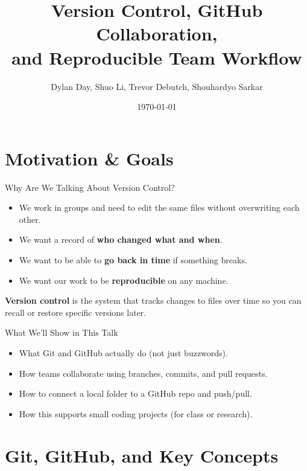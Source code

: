 \documentclass{beamer}
\title[Collaboration with GitHub \hspace{3mm} Version Control in Practice \hspace{7em} \insertframenumber/\inserttotalframenumber]
{Version Control, GitHub Collaboration,\\ and Reproducible Team Workflow}
\author[Group Project]{Dylan Day, Shuo Li, Trevor Debutch, Shouhardyo Sarkar}
\date{\today}
\institute[The University of Iowa]{The University of Iowa, Department of Statistics and Actuarial Science}
\begin{document}

\frame{\titlepage}

\section{Motivation \& Goals}

\begin{frame}{Why Are We Talking About Version Control?}
  \begin{itemize}
    \item We work in groups and need to edit the same files without overwriting each other.
    \item We want a record of \textbf{who changed what and when}.
    \item We want to be able to \textbf{go back in time} if something breaks.
    \item We want our work to be \textbf{reproducible} on any machine.
  \end{itemize}

  \vspace{2mm}
  \textbf{Version control} is the system that tracks changes to files over time so you can recall or restore specific versions later.
\end{frame}

\begin{frame}{What We'll Show in This Talk}
  \begin{itemize}
    \item What Git and GitHub actually do (not just buzzwords).
    \item How teams collaborate using branches, commits, and pull requests.
    \item How to connect a local folder to a GitHub repo and push/pull.
    \item How this supports small coding projects (for class or research).
  \end{itemize}
\end{frame}

\section{Git, GitHub, and Key Concepts}
\end{document}
